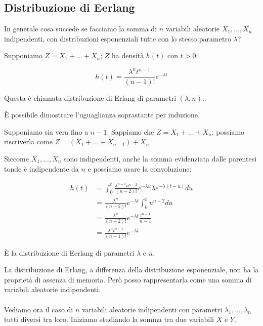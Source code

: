 \documentclass[a4paper,12pt]{book}
\begin{document}
\subsection{Distribuzione di Eerlang} %
In generale cosa succede se facciamo la somma di $ n $ variabili aleatorie $ X_1, ..., X_n $ indipendenti, con distribuzioni esponenziali tutte con lo stesso parametro $\lambda$? 

Supponiamo $ Z = X_1 + ... + X_n $; $ Z $ ha densità $ h(t) $ con $ t > 0 $:

$$ h(t) = \frac{\lambda^n t^{n-1}}{(n-1)!} e^{-\lambda t} $$

Questa è chiamata distribuzione di Erlang di parametri $ (\lambda, n) $.

È possibile dimostrare l'uguaglianza soprastante per induzione. 

Supponiamo sia vera fino a $ n-1 $. Sappiamo che $ Z = X_1 + ... + X_n $; possiamo riscriverla come 
$ Z = (X_1 + ... + X_{n-1}) + X_n $

Siccome $ X_1, ..., X_n $ sono indipendenti, anche la somma evidenziata dalle parentesi tonde è indipendente da $ n $ e possiamo usare la convoluzione:

\begin{align*}
	h(t) & = \int_{0}^{t}\frac{\lambda^{n-1} u^{n-2}}{(n-2)!} e^{-\lambda u} \lambda e^{-\lambda(t-u)} du \\
	& = \frac{\lambda^n}{(n-2)!}e^{-\lambda t} \int_{0}^{t} u^{n-2} du \\
	& = \frac{\lambda^n}{(n-2)!} e^{-\lambda t} \frac{t^{n-1}}{n-1} \\
	& = \frac{\lambda^n t^{n-1}}{(n-1)!} e^{-\lambda t}
\end{align*}

È la distribuzione di Eerlang di parametri $\lambda$ e $ n $. 

La distribuzione di Erlang, a differenza della distribuzione esponenziale, non ha la proprietà di assenza di memoria. Però posso rappresentarla come una somma di variabili aleatorie indipendenti. 
\\
\\
Vediamo ora il caso di $ n $ variabili aleatorie indipendenti con parametri $ \lambda_1, ..., \lambda_n $ tutti diversi tra loro. Iniziamo studiando la somma tra due variabili $ X $ e $ Y $.
\end{document}
